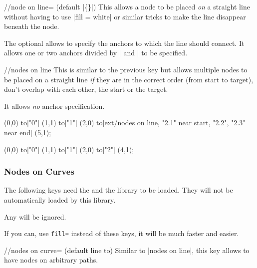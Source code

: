 \begin{multicols}{2}
\begin{stylekey}{/\tikzext/node on line= (default |\{\}|)}
This allows a node to be placed \emph{on} a straight line without having to
use |fill = white| or similar tricks to make the line disappear 
beneath the node.

The optional  allows to specify the
anchors to which the line should connect.
It allows one or two anchors divided by | and | to be specified.
\end{stylekey}

\begin{stylekey}{/\tikzext/nodes on line}
This is similar to the previous key but allows
multiple nodes to be placed on a straight line
\emph{if} they are in the correct order (from start to target),
don't overlap with each other, the start or the target.

It allows \emph{no} anchor specification.
\end{stylekey}

\begin{codeexample}[preamble=\usetikzlibrary{ext.nodes, quotes}]
\tikz[inner sep=.15em, circle, nodes=draw, sloped]
   (0,0) to["0"] (1,1)
                                                 to["1"] (2,0)
    to[ext/nodes on line, "2.1" near start, "2.2", "2.3" near end] (5,1);
\end{codeexample}
\begin{codeexample}[preamble=\usetikzlibrary{ext.nodes, quotes}]
\tikz[inner sep=.15em, nodes=draw]
  \draw[thick, ->, ext/node on line=west and east]
     (0,0) to["0"] (1,1)
           to["1"] (2,0)
           to["2"] (4,1);
\end{codeexample}

\subsubsection{Nodes on Curves}
The following keys need the 
and the  \cite{spath3}
library to be loaded. They will not be automatically
loaded by this library.

Any  will be ignored.

If you can, use \texttt{fill=}
instead of these keys, it will be much faster and easier.

\begin{stylekey}{/\tikzext/nodes on curve= (default line to)}
Similar to |nodes on line|, this key allows
to have nodes on arbitrary paths.


\end{stylekey}
\end{multicols}
